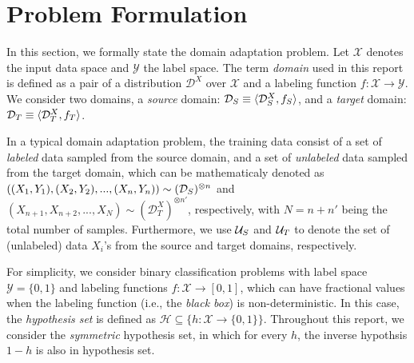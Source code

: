 \section{Problem Formulation}\label{sect:prob_form}
In this section, we formally state the domain adaptation problem. Let $\mathcal{X}$ denotes the input data space and $\mathcal{Y}$ the label space. The term \textit{domain} used in this report is defined as a pair of a distribution $\mathcal{D}^X$ over $\mathcal{X}$ and a labeling function $f: \mathcal{X} \rightarrow \mathcal{Y}$. We consider two domains, a \textit{source} domain: $\mathcal{D}_S \equiv \langle \mathcal{D}^X_S, f_S \rangle$, and a \textit{target} domain: $\mathcal{D}_T \equiv \langle \mathcal{D}^X_T, f_T \rangle$.

In a typical domain adaptation problem, the training data consist of a set of \textit{labeled} data sampled from the source domain, and a set of \textit{unlabeled} data sampled from the target domain, which can be mathematicaly denoted as $((X_1,Y_1),(X_2,Y_2),...,(X_n,Y_n)) \sim (\mathcal{D}_S)^{\otimes n}$ and $(X_{n+1},X_{n+2},...,X_N) \sim (\mathcal{D}^X_T)^{\otimes n'}$, respectively, with $N=n+n'$ being the total number of samples. Furthermore, we use $\mathcal{U}_S$ and $\mathcal{U}_T$ to denote the set of (unlabeled) data $X_i$'s from the source and target domains, respectively.


For simplicity, we consider binary classification problems with label space $\mathcal{Y}=\{0, 1\}$ and labeling functions $f: \mathcal{X} \rightarrow [0,1]$, which can have fractional values when the labeling function (i.e., the \textit{black box}) is non-deterministic. In this case, the \textit{hypothesis set} is defined as $\mathcal{H} \subseteq \{h:\mathcal{X} \rightarrow \{0,1\}\}$. Throughout this report, we consider the \textit{symmetric} hypothesis set, in which for every $h$, the inverse hypothsis $1-h$ is also in hypothesis set.

